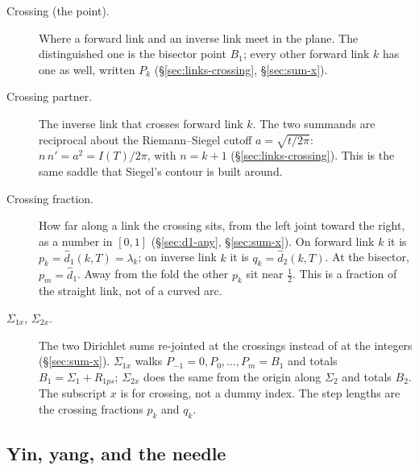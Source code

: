 \documentclass[11pt]{article}
\theoremstyle{definition}
\begin{document}
\begin{description}
\item[Crossing (the point).]
Where a forward link and an inverse link meet in the plane.
The distinguished one is the bisector point $B_1$; every other
forward link $k$ has one as well, written $P_k$
(\S\ref{sec:links-crossing}, \S\ref{sec:sum-x}).

\item[Crossing partner.]
The inverse link that crosses forward link $k$.
The two summands are reciprocal about the Riemann--Siegel cutoff
$a=\sqrt{t/2\pi}$:
$n\,n'=a^{2}=I(T)/2\pi$, with $n=k+1$
(\S\ref{sec:links-crossing}).
This is the same saddle that Siegel's contour is built around.

\item[Crossing fraction.]
How far along a link the crossing sits, from the left joint toward
the right, as a number in $[0,1]$
(\S\ref{sec:d1-any}, \S\ref{sec:sum-x}).
On forward link $k$ it is $p_k=\hat d_1(k,T)=\lambda_k$; on inverse
link $k$ it is $q_k=\hat d_2(k,T)$.
At the bisector, $p_m=\hat d_1$.
Away from the fold the other $p_k$ sit near $\tfrac12$.
This is a fraction of the straight link, not of a curved arc.

\item[$\Sigma_{1x}$, $\Sigma_{2x}$.]
The two Dirichlet sums re-jointed at the crossings instead of at
the integers
(\S\ref{sec:sum-x}).
$\Sigma_{1x}$ walks $P_{-1}=0,P_0,\dots,P_m=B_1$ and totals
$B_1=\Sigma_1+R_{1ps}$;
$\Sigma_{2x}$ does the same from the origin along $\Sigma_2$ and
totals $B_2$.
The subscript $x$ is for crossing, not a dummy index.
The step lengths are the crossing fractions $p_k$ and $q_k$.
\end{description}

\subsection*{Yin, yang, and the needle}
\end{document}
